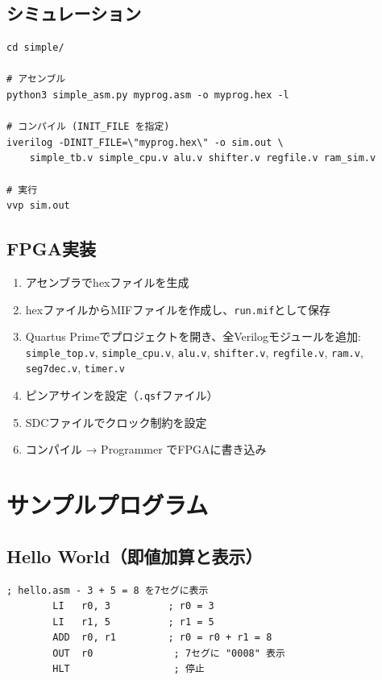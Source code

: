 \documentclass[a4paper,11pt]{ltjsarticle}
\begin{document}
\subsection{シミュレーション}

\begin{lstlisting}[language={},caption={iverilog によるシミュレーション}]
cd simple/

# アセンブル
python3 simple_asm.py myprog.asm -o myprog.hex -l

# コンパイル (INIT_FILE を指定)
iverilog -DINIT_FILE=\"myprog.hex\" -o sim.out \
    simple_tb.v simple_cpu.v alu.v shifter.v regfile.v ram_sim.v

# 実行
vvp sim.out
\end{lstlisting}

\subsection{FPGA実装}

\begin{enumerate}
\item アセンブラでhexファイルを生成
\item hexファイルからMIFファイルを作成し、\texttt{run.mif}として保存
\item Quartus Primeでプロジェクトを開き、全Verilogモジュールを追加:
      \texttt{simple\_top.v}, \texttt{simple\_cpu.v}, \texttt{alu.v},
      \texttt{shifter.v}, \texttt{regfile.v}, \texttt{ram.v},
      \texttt{seg7dec.v}, \texttt{timer.v}
\item ピンアサインを設定（\texttt{.qsf}ファイル）
\item SDCファイルでクロック制約を設定
\item コンパイル → Programmer でFPGAに書き込み
\end{enumerate}


\section{サンプルプログラム}

\subsection{Hello World（即値加算と表示）}

\begin{lstlisting}[language={},caption={最初のプログラム}]
; hello.asm - 3 + 5 = 8 を7セグに表示
        LI   r0, 3          ; r0 = 3
        LI   r1, 5          ; r1 = 5
        ADD  r0, r1         ; r0 = r0 + r1 = 8
        OUT  r0              ; 7セグに "0008" 表示
        HLT                  ; 停止
\end{lstlisting}
\end{document}
